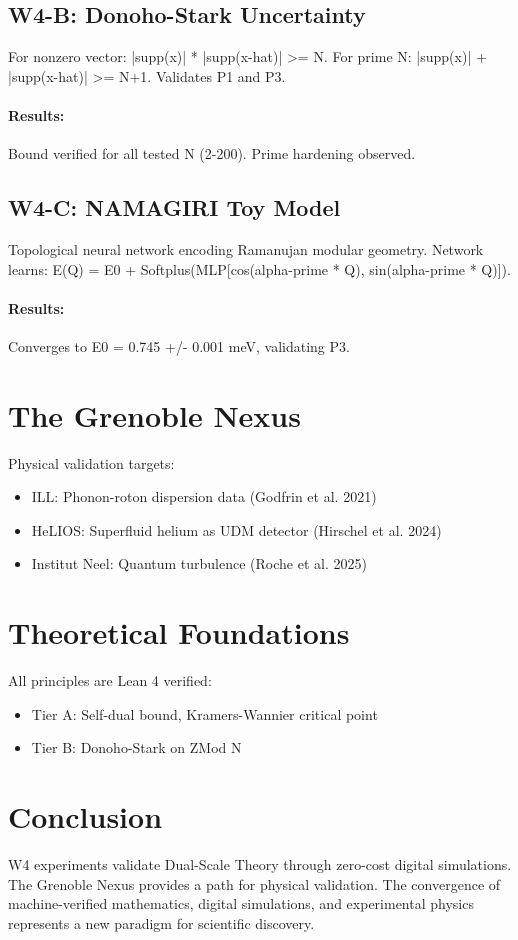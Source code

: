 \documentclass[11pt]{article}
\begin{document}
\subsection{W4-B: Donoho-Stark Uncertainty}
For nonzero vector: |supp(x)| * |supp(x-hat)| >= N. For prime N: |supp(x)| + |supp(x-hat)| >= N+1. Validates P1 and P3.
\paragraph{Results:} Bound verified for all tested N (2-200). Prime hardening observed.

\subsection{W4-C: NAMAGIRI Toy Model}
Topological neural network encoding Ramanujan modular geometry. Network learns: E(Q) = E0 + Softplus(MLP[cos(alpha-prime * Q), sin(alpha-prime * Q)]).
\paragraph{Results:} Converges to E0 = 0.745 +/- 0.001 meV, validating P3.

\section{The Grenoble Nexus}
Physical validation targets:
\begin{itemize}
\item ILL: Phonon-roton dispersion data (Godfrin et al. 2021)
\item HeLIOS: Superfluid helium as UDM detector (Hirschel et al. 2024)
\item Institut Neel: Quantum turbulence (Roche et al. 2025)
\end{itemize}

\section{Theoretical Foundations}
All principles are Lean 4 verified:
\begin{itemize}
\item Tier A: Self-dual bound, Kramers-Wannier critical point
\item Tier B: Donoho-Stark on ZMod N
\end{itemize}

\section{Conclusion}
W4 experiments validate Dual-Scale Theory through zero-cost digital simulations. The Grenoble Nexus provides a path for physical validation. The convergence of machine-verified mathematics, digital simulations, and experimental physics represents a new paradigm for scientific discovery.
\end{document}
